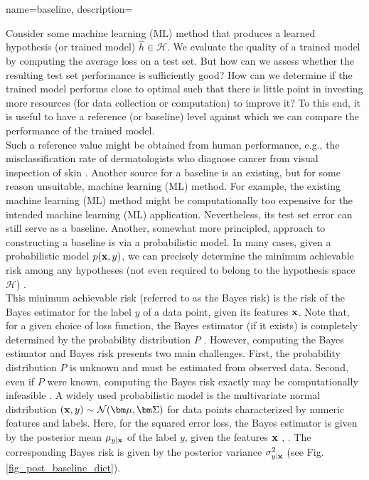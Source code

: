 {
{name={baseline},
    description={Consider some machine learning (ML) method that produces a learned 
    	hypothesis (or trained model) $\hat{h} \in \mathcal{H}$. We evaluate the quality of a trained model 
    	by computing the average loss on a test set. But how can we assess 
    	whether the resulting test set performance is sufficiently good? How can we 
    	determine if the trained model performs close to optimal such that there is little point 
   	in investing more resources (for data collection or computation) to improve it? 
    	To this end, it is useful to have a reference (or baseline) level against which 
    	we can compare the performance of the trained model. \\
	Such a reference value might be obtained from human performance, e.g., the misclassification rate of dermatologists 
    	who diagnose cancer from visual inspection of skin \cite{SkinHumanAI}. Another source for a baseline is an existing, 
    	but for some reason unsuitable, machine learning (ML) method. For example, the existing machine learning (ML) method 
    	might be computationally too expensive for the intended machine learning (ML) application. 
    	Nevertheless, its test set error can still serve as a baseline. Another, somewhat more principled, 
    	approach to constructing a baseline is via a probabilistic model. In many cases, given a probabilistic model $p({\bf x},y)$,  
    	we can precisely determine the minimum achievable risk among any hypotheses
    	(not even required to belong to the hypothesis space $\mathcal{H}$) \cite{LC}. \\
    	This minimum achievable risk (referred to as the Bayes risk) is the risk 
    	of the Bayes estimator for the label $y$ of a data point, given
    	its features ${\bf x}$. Note that, for a given choice of loss function, the 
    	Bayes estimator (if it exists) is completely determined by the probability distribution 
		$P$ \cite[Ch. 4]{LC}. However, computing the Bayes estimator 
		and Bayes risk presents two main challenges. First, the probability distribution 
		$P$ is unknown and 
		must be estimated from observed data. Second, even if $P$ 
		were known, computing the Bayes risk exactly may be computationally 
		infeasible \cite{cooper1990computational}. 
	A widely used probabilistic model is the multivariate normal distribution $\left( {\bf x},y \right) \sim \mathcal{N}({\bm \mu},{\bm \Sigma})$ 
	for data points characterized by numeric features and labels.
	Here, for the squared error loss, the Bayes estimator is given by the posterior 
	mean $\mu_{y|{\bf x}}$ of the label $y$, given the 
	features ${\bf x}$ \cite{LC}, \cite{GrayProbBook}. The corresponding Bayes risk 
	is given by the posterior variance 
	$\sigma^{2}_{y|{\bf x}}$ (see Fig. \ref{fig_post_baseline_dict}).
	\begin{figure}[H]
		\begin{center}
		\begin{tikzpicture}
			

\end{tikzpicture}
\end{center}
\end{figure}}}}
